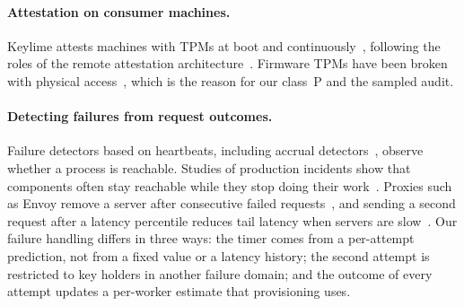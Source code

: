 \paragraph{Attestation on consumer machines.} Keylime attests machines with TPMs at boot and
continuously~\cite{schear2016keylime}, following the roles of the remote attestation
architecture~\cite{rfc9334}. Firmware TPMs have been broken with physical access~\cite{jacob2023faultpm}, which is
the reason for our class~P and the sampled audit.

\paragraph{Detecting failures from request outcomes.} Failure detectors based on heartbeats, including accrual
detectors~\cite{hayashibara2004phi}, observe whether a process is reachable. Studies of production incidents show
that components often stay reachable while they stop doing their work~\cite{huang2017gray}. Proxies such as Envoy
remove a server after consecutive failed requests~\cite{envoyoutlier}, and sending a second request after a
latency percentile reduces tail latency when servers are slow~\cite{dean2013tail}. Our failure handling differs in
three ways: the timer comes from a per-attempt prediction, not from a fixed value or a latency history; the second
attempt is restricted to key holders in another failure domain; and the outcome of every attempt updates a per-worker
estimate that provisioning uses.
